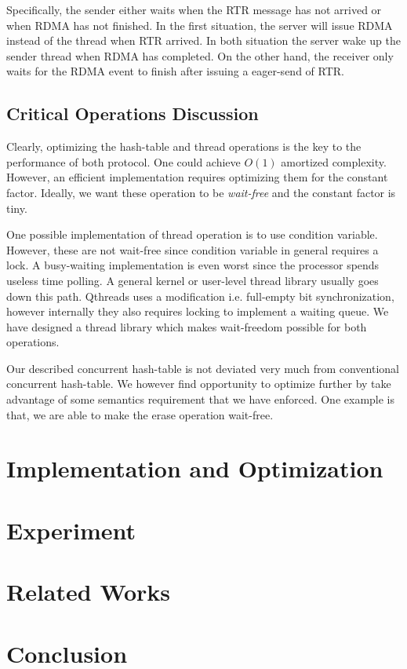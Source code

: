 \documentclass[11pt]{article}
\begin{document}
Specifically, the sender either waits when the RTR message has not arrived or
when RDMA has not finished. In the first situation, the server will issue RDMA
instead of the thread when RTR arrived. In both situation the server wake up
the sender thread when RDMA has completed. On the other hand, the receiver only
waits for the RDMA event to finish after issuing a eager-send of RTR.

\subsection{Critical Operations Discussion}
Clearly, optimizing the hash-table and thread operations is the key to the
performance of both protocol. One could achieve $O(1)$ amortized complexity.
However, an efficient implementation requires optimizing them for the constant
factor. Ideally, we want these operation to be \textit{wait-free} and the
constant factor is tiny. 

One possible implementation of thread operation is to use condition variable.
However, these are not wait-free since condition variable in general requires a
lock. A busy-waiting implementation is even worst since the processor spends
useless time polling. A general kernel or user-level thread library usually goes
down this path. Qthreads uses a modification i.e. full-empty bit
synchronization, however internally they also requires locking to implement a
waiting queue. We have designed a thread library which makes wait-freedom
possible for both operations.

Our described concurrent hash-table is not deviated very much from conventional
concurrent hash-table. We however find opportunity to optimize further by take
advantage of some semantics requirement that we have enforced. One example is
that, we are able to make the erase operation wait-free.

\section{Implementation and Optimization}

\section{Experiment}
\section{Related Works}
\section{Conclusion}
\end{document}
